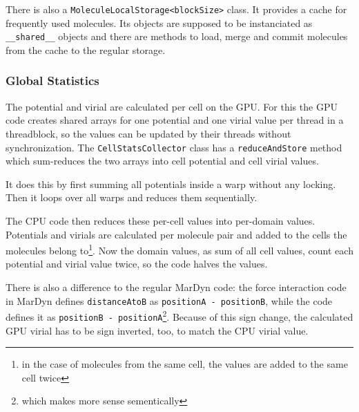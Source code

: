 There is also a \lstinline!MoleculeLocalStorage<blockSize>! class. It provides a cache for frequently used molecules. Its objects are supposed to be instanciated as \lstinline!__shared__! objects and there are methods to load, merge and commit molecules from the cache to the regular storage.

\subsubsection{Global Statistics}
The potential and virial are calculated per cell on the GPU. For this the GPU code creates shared arrays for one potential and one virial value per thread in a threadblock, so the values can be updated by their threads without synchronization. The \lstinline!CellStatsCollector! class has a \lstinline!reduceAndStore! method which sum-reduces the two arrays into cell potential and cell virial values.

It does this by first summing all potentials inside a warp without any locking. Then it loops over all warps and reduces them sequentially.

The CPU code then reduces these per-cell values into per-domain values. Potentials and virials are calculated per molecule pair and added to the cells the molecules belong to\footnote{in the case of molecules from the same cell, the values are added to the same cell twice}. Now the domain values, as sum of all cell values, count each potential and virial value twice, so the code halves the values.

There is also a difference to the regular MarDyn code: the force interaction code in MarDyn defines \lstinline!distanceAtoB! as \lstinline!positionA - positionB!, while the \cuda{} code defines it as \lstinline!positionB - positionA!\footnote{which makes more sense sementically}. Because of this sign change, the calculated GPU virial has to be sign inverted, too, to match the CPU virial value.

